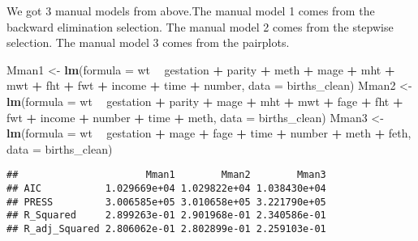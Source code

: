 \documentclass[]{article}
\newenvironment{Shaded}{\begin{snugshade}}{\end{snugshade}}
\newcommand{\KeywordTok}[1]{\textcolor[rgb]{0.13,0.29,0.53}{\textbf{#1}}}
\newcommand{\DataTypeTok}[1]{\textcolor[rgb]{0.13,0.29,0.53}{#1}}
\newcommand{\StringTok}[1]{\textcolor[rgb]{0.31,0.60,0.02}{#1}}
\newcommand{\OperatorTok}[1]{\textcolor[rgb]{0.81,0.36,0.00}{\textbf{#1}}}
\newcommand{\NormalTok}[1]{#1}
\begin{document}
We got 3 manual models from above.The manual model 1 comes from the
backward elimination selection. The manual model 2 comes from the
stepwise selection. The manual model 3 comes from the pairplots.

\begin{Shaded}
\begin{Highlighting}[]
\NormalTok{Mman1 <-}\StringTok{ }\KeywordTok{lm}\NormalTok{(}\DataTypeTok{formula =}\NormalTok{ wt }\OperatorTok{~}\StringTok{ }\NormalTok{gestation }\OperatorTok{+}\StringTok{ }\NormalTok{parity }\OperatorTok{+}\StringTok{ }\NormalTok{meth }\OperatorTok{+}\StringTok{ }\NormalTok{mage }\OperatorTok{+}\StringTok{ }\NormalTok{mht }\OperatorTok{+}\StringTok{ }\NormalTok{mwt }\OperatorTok{+}\StringTok{ }
\StringTok{    }\NormalTok{fht }\OperatorTok{+}\StringTok{ }\NormalTok{fwt }\OperatorTok{+}\StringTok{ }\NormalTok{income }\OperatorTok{+}\StringTok{ }\NormalTok{time }\OperatorTok{+}\StringTok{ }\NormalTok{number,  }\DataTypeTok{data =}\NormalTok{ births_clean)}
\NormalTok{Mman2 <-}\StringTok{ }\KeywordTok{lm}\NormalTok{(}\DataTypeTok{formula =}\NormalTok{ wt }\OperatorTok{~}\StringTok{ }\NormalTok{gestation }\OperatorTok{+}\StringTok{ }\NormalTok{parity }\OperatorTok{+}\StringTok{ }\NormalTok{mage }\OperatorTok{+}\StringTok{ }\NormalTok{mht }\OperatorTok{+}\StringTok{ }\NormalTok{mwt }\OperatorTok{+}\StringTok{ }\NormalTok{fage }\OperatorTok{+}\StringTok{ }
\StringTok{    }\NormalTok{fht }\OperatorTok{+}\StringTok{ }\NormalTok{fwt }\OperatorTok{+}\StringTok{ }\NormalTok{income }\OperatorTok{+}\StringTok{ }\NormalTok{number }\OperatorTok{+}\StringTok{ }\NormalTok{time }\OperatorTok{+}\StringTok{ }\NormalTok{meth,  }\DataTypeTok{data =}\NormalTok{ births_clean)}
\NormalTok{Mman3 <-}\StringTok{ }\KeywordTok{lm}\NormalTok{(}\DataTypeTok{formula =}\NormalTok{ wt }\OperatorTok{~}\StringTok{ }\NormalTok{gestation }\OperatorTok{+}\StringTok{ }\NormalTok{mage }\OperatorTok{+}\StringTok{ }\NormalTok{fage  }\OperatorTok{+}\StringTok{ }\NormalTok{time }\OperatorTok{+}\StringTok{ }\NormalTok{number }\OperatorTok{+}\StringTok{ }\NormalTok{meth }\OperatorTok{+}\StringTok{ }\NormalTok{feth, }
            \DataTypeTok{data =}\NormalTok{ births_clean)}
\end{Highlighting}
\end{Shaded}

\begin{verbatim}
##                      Mman1        Mman2        Mman3
## AIC           1.029669e+04 1.029822e+04 1.038430e+04
## PRESS         3.006585e+05 3.010658e+05 3.221790e+05
## R_Squared     2.899263e-01 2.901968e-01 2.340586e-01
## R_adj_Squared 2.806062e-01 2.802899e-01 2.259103e-01
\end{verbatim}
\end{document}

